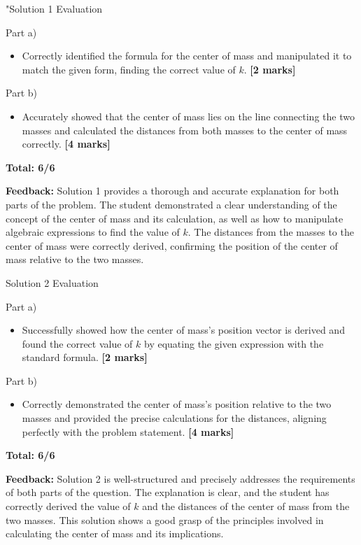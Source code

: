 \documentclass[a4paper,11pt]{article}
\begin{document}
"Solution 1 Evaluation

Part a)
\begin{itemize}
    \item Correctly identified the formula for the center of mass and manipulated it to match the given form, finding the correct value of \( k \). \textbf{[2 marks]}
\end{itemize}

Part b)
\begin{itemize}
    \item Accurately showed that the center of mass lies on the line connecting the two masses and calculated the distances from both masses to the center of mass correctly. \textbf{[4 marks]}
\end{itemize}

\textbf{Total: 6/6}

\textbf{Feedback:} Solution 1 provides a thorough and accurate explanation for both parts of the problem. The student demonstrated a clear understanding of the concept of the center of mass and its calculation, as well as how to manipulate algebraic expressions to find the value of \( k \). The distances from the masses to the center of mass were correctly derived, confirming the position of the center of mass relative to the two masses.

Solution 2 Evaluation

Part a)
\begin{itemize}
    \item Successfully showed how the center of mass's position vector is derived and found the correct value of \( k \) by equating the given expression with the standard formula. \textbf{[2 marks]}
\end{itemize}

Part b)
\begin{itemize}
    \item Correctly demonstrated the center of mass's position relative to the two masses and provided the precise calculations for the distances, aligning perfectly with the problem statement. \textbf{[4 marks]}
\end{itemize}

\textbf{Total: 6/6}

\textbf{Feedback:} Solution 2 is well-structured and precisely addresses the requirements of both parts of the question. The explanation is clear, and the student has correctly derived the value of \( k \) and the distances of the center of mass from the two masses. This solution shows a good grasp of the principles involved in calculating the center of mass and its implications.
\end{document}
